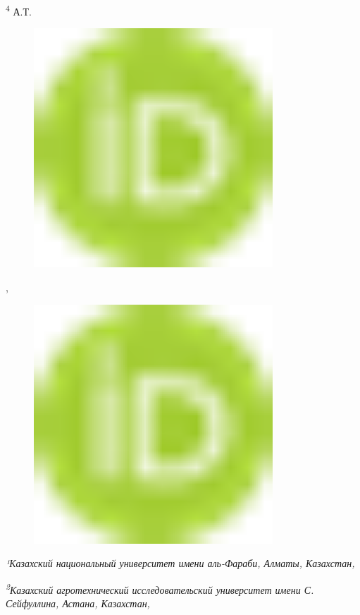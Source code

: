 {\textsuperscript{4} А.Т.
\begin{figure}[H]
	\centering
	\includegraphics[width=0.8\textwidth]{media/ict/image1}
	\caption*{}
\end{figure}

,
\begin{figure}[H]
	\centering
	\includegraphics[width=0.8\textwidth]{media/ict/image1}
	\caption*{}
\end{figure}


\emph{¹Казахский национальный университет имени аль-Фараби, Алматы,
Казахстан,}

\emph{\textsuperscript{2}Казахский агротехнический исследовательский
университет имени С. Сейфуллина, Астана, Казахстан,}

}
